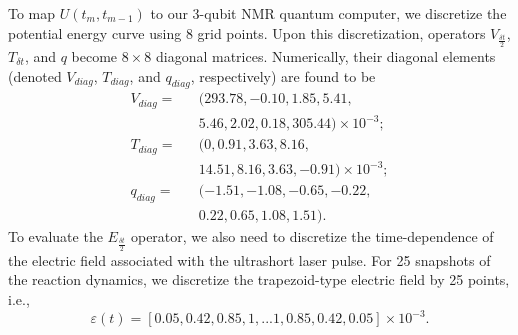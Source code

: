 \documentclass[twocolumn,showpacs,twoside,10pt,prl]{revtex4}
\begin{document}
To map $U(t_m,t_{m-1})$ to our 3-qubit NMR quantum computer, we discretize the potential energy curve using 8 grid points. Upon this discretization,
operators $V_{\frac{\delta t}{2}}$, $T_{\delta t}$, and $q$ become $8\times 8$ diagonal matrices. Numerically,  their diagonal elements  (denoted
$V_{diag}$, $T_{diag}$, and $q_{diag}$, respectively) are found to be
\begin{eqnarray}\label{operator}
  {V}_{diag} =&&(293.78,-0.10,1.85,5.41,\nonumber\\
             &&  5.46,2.02,0.18,305.44)\times 10^{-3};\nonumber\\
  {T}_{diag} =&&(0,0.91,3.63,8.16,\nonumber\\
&&  14.51,8.16,3.63,-0.91)\times 10^{-3};\nonumber\\
  {q}_{diag} =&&(-1.51,-1.08,-0.65,-0.22,\nonumber\\
&&  0.22,0.65,1.08,1.51).
\end{eqnarray}
To evaluate the $E_{\frac{\delta t}{2}}$ operator, we also need to discretize the time-dependence of the electric field associated with the ultrashort laser pulse.  For 25 snapshots of the reaction dynamics, we discretize the trapezoid-type electric field by 25 points, i.e., \begin{equation}\label{varepsilon}
\varepsilon(t)=[0.05,0.42,0.85,1,...1,0.85,0.42,0.05] \times 10^{-3}.
\end{equation}
\end{document}
